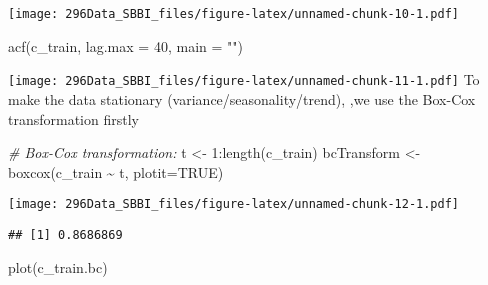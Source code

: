 \documentclass[
]{article}
\newenvironment{Shaded}{\begin{snugshade}}{\end{snugshade}}
\newcommand{\AttributeTok}[1]{\textcolor[rgb]{0.77,0.63,0.00}{#1}}
\newcommand{\CommentTok}[1]{\textcolor[rgb]{0.56,0.35,0.01}{\textit{#1}}}
\newcommand{\ConstantTok}[1]{\textcolor[rgb]{0.00,0.00,0.00}{#1}}
\newcommand{\DecValTok}[1]{\textcolor[rgb]{0.00,0.00,0.81}{#1}}
\newcommand{\FunctionTok}[1]{\textcolor[rgb]{0.00,0.00,0.00}{#1}}
\newcommand{\NormalTok}[1]{#1}
\newcommand{\OtherTok}[1]{\textcolor[rgb]{0.56,0.35,0.01}{#1}}
\newcommand{\SpecialCharTok}[1]{\textcolor[rgb]{0.00,0.00,0.00}{#1}}
\newcommand{\StringTok}[1]{\textcolor[rgb]{0.31,0.60,0.02}{#1}}
\begin{document}
\texttt{[image: 296Data\_SBBI\_files/figure-latex/unnamed-chunk-10-1.pdf]}

\begin{Shaded}
\begin{Highlighting}[]
\FunctionTok{acf}\NormalTok{(c\_train, }\AttributeTok{lag.max =} \DecValTok{40}\NormalTok{, }\AttributeTok{main =} \StringTok{""}\NormalTok{)}
\end{Highlighting}
\end{Shaded}

\texttt{[image: 296Data\_SBBI\_files/figure-latex/unnamed-chunk-11-1.pdf]}
To make the data stationary (variance/seasonality/trend), ,we use the
Box-Cox transformation firstly

\begin{Shaded}
\begin{Highlighting}[]
\CommentTok{\# Box{-}Cox transformation:}
\NormalTok{t }\OtherTok{\textless{}{-}} \DecValTok{1}\SpecialCharTok{:}\FunctionTok{length}\NormalTok{(c\_train)}
\NormalTok{bcTransform }\OtherTok{\textless{}{-}} \FunctionTok{boxcox}\NormalTok{(c\_train }\SpecialCharTok{\textasciitilde{}}\NormalTok{ t, }\AttributeTok{plotit=}\ConstantTok{TRUE}\NormalTok{)}
\end{Highlighting}
\end{Shaded}

\texttt{[image: 296Data\_SBBI\_files/figure-latex/unnamed-chunk-12-1.pdf]}

\begin{Shaded}
\end{Shaded}

\begin{verbatim}
## [1] 0.8686869
\end{verbatim}

\begin{Shaded}
\begin{Highlighting}[]
\FunctionTok{plot}\NormalTok{(c\_train.bc)}
\end{Highlighting}
\end{Shaded}
\end{document}
